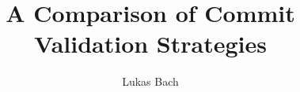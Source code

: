 \documentclass[twoside, english, draft]{sdqseminar}
\author{Lukas Bach}
\title{A Comparison of Commit Validation Strategies}
\begin{document}
\setpdf
\maketitle

\begin{abstract}

\end{abstract}




\printbibliography[heading=bibintoc]
\end{document}
